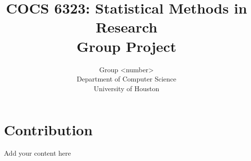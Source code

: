 \documentclass[10pt]{article}         %
\title{COCS 6323: Statistical Methods in Research \\ Group Project} %
\author{Group <number> \\
        Department of Computer Science\\
        University of Houston}         %
\begin{document}



\maketitle              %

\newpage
\tableofcontents        %
\listoftables           %
\listoffigures          %

\newpage
\section{Contribution}
Add your content here\\

\newpage
\end{document}
